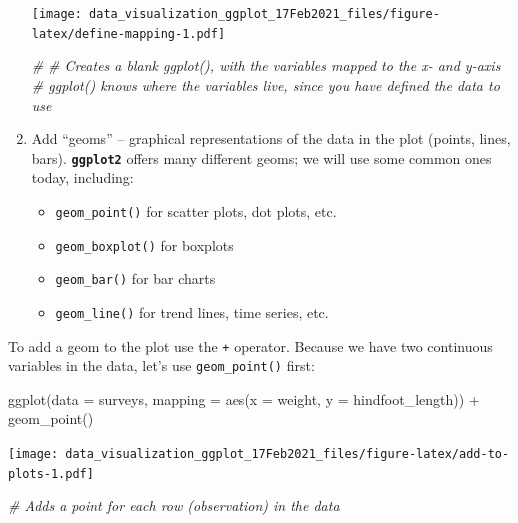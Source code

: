 \documentclass[
]{article}
\newenvironment{Shaded}{\begin{snugshade}}{\end{snugshade}}
\newcommand{\AttributeTok}[1]{\textcolor[rgb]{0.77,0.63,0.00}{#1}}
\newcommand{\CommentTok}[1]{\textcolor[rgb]{0.56,0.35,0.01}{\textit{#1}}}
\newcommand{\FunctionTok}[1]{\textcolor[rgb]{0.00,0.00,0.00}{#1}}
\newcommand{\NormalTok}[1]{#1}
\newcommand{\SpecialCharTok}[1]{\textcolor[rgb]{0.00,0.00,0.00}{#1}}
\providecommand{\tightlist}{%
  \setlength{\itemsep}{0pt}\setlength{\parskip}{0pt}}
\begin{document}
\begin{enumerate}
  \texttt{[image: data\_visualization\_ggplot\_17Feb2021\_files/figure-latex/define-mapping-1.pdf]}

\begin{Shaded}
\begin{Highlighting}[]
\CommentTok{\#}
\CommentTok{\# Creates a blank ggplot(), with the variables mapped to the x{-} and y{-}axis}
\CommentTok{\# ggplot() knows where the variables live, since you have defined the data to use}
\end{Highlighting}
\end{Shaded}
\item
  Add ``geoms'' -- graphical representations of the data in the plot
  (points, lines, bars). \textbf{\texttt{ggplot2}} offers many different
  geoms; we will use some common ones today, including:

  \begin{itemize}
  \tightlist
  \item
    \texttt{geom\_point()} for scatter plots, dot plots, etc.
  \item
    \texttt{geom\_boxplot()} for boxplots\\
  \item
    \texttt{geom\_bar()} for bar charts
  \item
    \texttt{geom\_line()} for trend lines, time series, etc.
  \end{itemize}
\end{enumerate}

To add a geom to the plot use the \texttt{+} operator. Because we have
two continuous variables in the data, let's use \texttt{geom\_point()}
first:

\begin{Shaded}
\begin{Highlighting}[]
\FunctionTok{ggplot}\NormalTok{(}\AttributeTok{data =}\NormalTok{ surveys, }
       \AttributeTok{mapping =} \FunctionTok{aes}\NormalTok{(}\AttributeTok{x =}\NormalTok{ weight, }\AttributeTok{y =}\NormalTok{ hindfoot\_length)) }\SpecialCharTok{+}
  \FunctionTok{geom\_point}\NormalTok{()}
\end{Highlighting}
\end{Shaded}

\texttt{[image: data\_visualization\_ggplot\_17Feb2021\_files/figure-latex/add-to-plots-1.pdf]}

\begin{Shaded}
\begin{Highlighting}[]
 \CommentTok{\# Adds a point for each row (observation) in the data  }
\end{Highlighting}
\end{Shaded}
\end{document}
